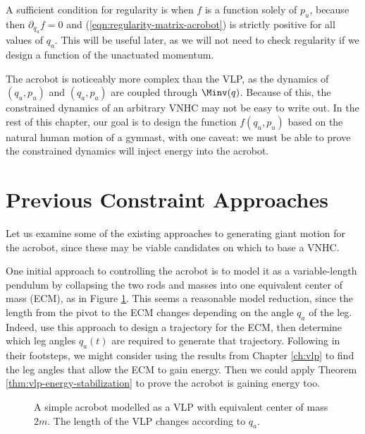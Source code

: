 A sufficient condition for regularity is when \(f\) is a function solely of \(p_u\),
because then \(\partial_{q_u}f = 0\) and (\ref{eqn:regularity-matrix-acrobot})
is strictly positive for all values of \(q_a\). 
This will be useful later, as we will not need to check regularity if we design
a function of the unactuated momentum. 

The acrobot is noticeably more complex than the VLP, as
the dynamics of \((q_u,p_u)\) and \((q_a,p_a)\) are coupled through \(\Minv(q)\).
Because of this, the constrained dynamics of an arbitrary VNHC may not be easy
to write out.
In the rest of this chapter, our goal is to design the function \(f(q_u,p_u)\)
based on the natural human motion of a gymnast, with one caveat: 
we must be able to prove the constrained dynamics will inject energy into the
acrobot.

\section{Previous Constraint Approaches}
Let us examine some of the existing approaches to generating giant motion for
the acrobot, since these may be viable candidates on which to base a VNHC.

One initial approach to controlling the acrobot is to model it as a
variable-length pendulum by collapsing the two rods and masses into one
equivalent center of mass (ECM), as in Figure \ref{fig:acrobot-ecm}.
This seems a reasonable model reduction, since the length from the pivot to the
ECM changes depending on the angle \(q_a\) of the leg.
Indeed, \citet{swingup_giant_acrobot} use this approach to design a trajectory
for the ECM, then determine which leg angles \(q_a(t)\) are required to generate
that trajectory.
Following in their footsteps, we might consider using the results
from Chapter \ref{ch:vlp} to find the leg angles that allow the ECM to gain
energy. 
Then we could apply Theorem \ref{thm:vlp-energy-stabilization} to prove
the acrobot is gaining energy too.
\begin{figure}
    \centering
    
    \caption{A simple acrobot modelled as a VLP with equivalent center of mass \(2m\). 
        The length of the VLP changes according to \(q_a\).}
    \label{fig:acrobot-ecm}
\end{figure}

